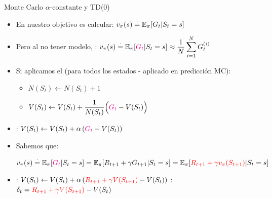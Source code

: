\documentclass[10pt, envcountsect, handout, aspectratio=1610, hyperref={hypertexnames=true}]{beamer}
\begin{document}
\begin{frame}{Monte Carlo $\alpha$-constante y TD(0)}
	
\begin{itemize}
%	
%		
		
	\item En   nuestro objetivo es calcular: $\displaystyle v_\pi(s) \stackrel{\cdot}{=} \mathbb{E}_\pi[G_t | S_t = s] $
	
		
	\item Pero al no tener modelo, : $\displaystyle v_\pi(s) \stackrel{\cdot}{=} \mathbb{E}_\pi[{\color{magenta} G_t} | S_t = s] \approx \frac{1}{N} \sum_{i=1}^{N} G_t^{(i)}$
	

		
	\item Si aplicamos el  (para todos los estados - aplicado en predicción MC):
		\begin{itemize}
			\item  $N(S_t) \leftarrow N(S_t) + 1$
			\item  $\displaystyle V(S_t) \gets V(S_t) + \frac{1}{N(S_t)} \Big({\color{magenta} G_t} - V(S_t)\Big)$ 
		\end{itemize}
	
	\item {}: $V(S_t) \gets V(S_t) + \alpha \left({\color{magenta}  G_t} - V(S_t)\right)$
	
	
	\item Sabemos que: 
	
	{\large $v_\pi(s) \stackrel{\cdot}{=} \mathbb{E}_\pi[{\color{magenta} G_t} | S_t = s] = \mathbb{E}_\pi[R_{t+1} + \gamma G_{t+1} | S_t = s] = \mathbb{E}_\pi[{\color{red} R_{t+1} + \gamma v_\pi(S_{t+1})} | S_t = s] $}
	
	\item {}: $V(S_t) \gets V(S_t) + \alpha \left({\color{red} R_{t+1} + \gamma V(S_{t+1})} - V(S_t)\right)$
		\hfill {}: $\delta_t={\color{red} R_{t+1} + \gamma V(S_{t+1})} - V(S_t)$
	

\end{itemize}
\end{frame}
\end{document}
